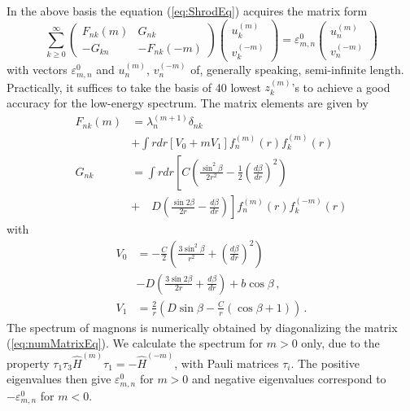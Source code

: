 \documentclass[aps,prb,twocolumn,superscriptaddress,nobalancelastpage]{revtex4-1}
\begin{document}
In the above basis the equation (\ref{eq:ShrodEq}) acquires the matrix form
\begin{equation}
\sum_{k\geq0}^{\infty}
 \begin{pmatrix}
F_{nk} (m)&G_{nk}\\
 - G_{kn} & - F_{nk} (-m)
 \end{pmatrix}
\begin{pmatrix}  u_k^{(m)}\\    v_k^{(-m)}  \end{pmatrix}  
 = \varepsilon^0_{m,n}  \begin{pmatrix}  u_n^{(m)}\\    v_n^{(-m)}  \end{pmatrix} 
\end{equation}
with vectors  $\varepsilon^0_{m,n}$ and $u_n^{(m)}$, $v_n^{(-m)}$  of, generally speaking,  semi-infinite length. 
Practically, it suffices to take the basis of 40 lowest $z_{k}^{(m)}$'s to achieve a good accuracy for the low-energy spectrum.  The  matrix elements are given by 
\begin{equation}
\begin{aligned}
F_{nk} \left( m \right) &=  \lambda _n^{(m + 1)}{\delta _{nk}} 
\\ & + \int rdr {\left[ V_0 +  m V_1 \right] f^{(m)}_{n} \left( r \right) f^{(m)}_{k} \left( r \right)}  \\ 
G_{nk}  &= \int rdr \left[ C\left( \frac{{{{\sin }^2}\beta }}{{2{r^2}}} - \frac{1}{2}{\left( \frac{d\beta}{dr} \right)}^2 \right) \right.    \\
& \left. + \quad D\left(\frac{\sin 2\beta}{2r} - \frac{d\beta}{{dr}}\right) \right]  f^{(m)}_{n} ( r  ) f^{(-m)}_{k} ( r ) 
\end{aligned}
\end{equation}
with 
\begin{equation}
\begin{aligned}
V_0 & =  - \frac C2 \left( \frac{3  \sin^{2}\beta}{ r^2}   +\left( \frac{d\beta }{dr} \right)^2 \right)   \\
& - D\left( \frac{3\sin2 \beta }{2r} + \frac{d\beta }{dr} \right) + b\cos \beta  \,, \\
V_1 & =  \frac{2}{r}\left( D\sin \beta  - \frac{C}{r} ( \cos \beta  + 1  ) \right) \,.
 \end{aligned} 
\end{equation}
The spectrum of magnons  is numerically  obtained by diagonalizing  the  matrix (\ref{eq:numMatrixEq}).
We calculate the spectrum for $m>0$ only, due to the property $ \tau _1 \tau_{3}{\widehat H^{(m)}} \tau _1 =  - {\widehat H^{( - m)}}$, with Pauli matrices $\tau_{i}$.     The positive eigenvalues then give $\varepsilon^0_{m,n}$ for $m>0$ and negative eigenvalues correspond to  $-\varepsilon^0_{m,n}$ for $m<0$.
\end{document}
